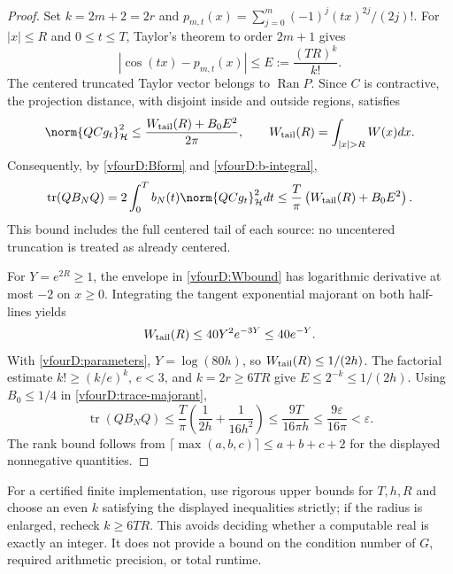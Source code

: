 \documentclass[11pt,a4paper]{article}
\numberwithin{equation}{section}
\theoremstyle{definition}\newtheorem{definition}[theorem]{Definition}
\theoremstyle{remark}\newtheorem{remark}[theorem]{Remark}
\newcommand{\Hh}{\mathcal H}\newcommand{\Hw}{\mathcal H}
\begin{document}
\begin{proof}
Set $k=2m+2=2r$ and $p_{m,t}(x)=\sum_{j=0}^m(-1)^j(tx)^{2j}/(2j)!$. For $|x|\le R$ and $0\le t\le T$, Taylor's theorem to order $2m+1$ gives
\[|\cos(tx)-p_{m,t}(x)|\le E:=\frac{(TR)^k}{k!}.
\]
The centered truncated Taylor vector belongs to $\operatorname{Ran}P$. Since $C$ is contractive, the projection distance, with disjoint inside and outside regions, satisfies
\begin{equation}\label{vfourD:distance}
 \norm{QCg_t}_{\Hh}^2\le\frac{W_{\rm tail}(R)+B_0E^2}{2\pi},\qquad W_{\rm tail}(R)=\int_{|x|>R}W(x)dx.
\end{equation}
Consequently, by \eqref{vfourD:Bform} and \eqref{vfourD:b-integral},
\begin{equation}\label{vfourD:trace-majorant}
 \operatorname{tr}(QB_NQ)=2\int_0^T b_N(t)\norm{QCg_t}_{\Hh}^2dt
 \le\frac{T}{\pi}\left(W_{\rm tail}(R)+B_0E^2\right).
\end{equation}
This bound includes the full centered tail of each source: no uncentered truncation is treated as already centered.

For $Y=e^{2R}\ge1$, the envelope in \eqref{vfourD:Wbound} has logarithmic derivative at most $-2$ on $x\ge0$. Integrating the tangent exponential majorant on both half-lines yields
\begin{equation}\label{vfourD:Wtail}
 W_{\rm tail}(R)\le40Y^2e^{-3Y}\le40e^{-Y}.
\end{equation}
With \eqref{vfourD:parameters}, $Y=\log(80h)$, so $W_{\rm tail}(R)\le1/(2h)$. The factorial estimate $k!\ge(k/e)^k$, $e<3$, and $k=2r\ge6TR$ give $E\le2^{-k}\le1/(2h)$. Using $B_0\le1/4$ in \eqref{vfourD:trace-majorant},
\[\operatorname{tr}(QB_NQ)\le\frac{T}{\pi}\left(\frac1{2h}+\frac1{16h^2}\right)
 \le\frac{9T}{16\pi h}\le\frac{9\varepsilon}{16\pi}<\varepsilon.
\]
The rank bound follows from $\lceil\max(a,b,c)\rceil\le a+b+c+2$ for the displayed nonnegative quantities.
\end{proof}
For a certified finite implementation, use rigorous upper bounds for $T,h,R$ and choose an even $k$ satisfying the displayed inequalities strictly; if the radius is enlarged, recheck $k\ge6TR$. This avoids deciding whether a computable real is exactly an integer. It does not provide a bound on the condition number of $G$, required arithmetic precision, or total runtime.
\end{document}

